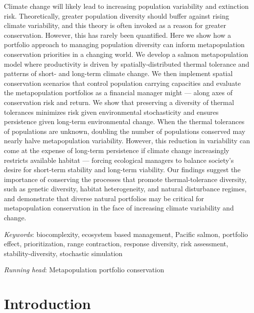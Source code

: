 \documentclass[12pt,english]{article}
\begin{document}
\begin{spacing}{1.9}
Climate change will likely lead to increasing population variability and extinction risk. Theoretically, greater population diversity should buffer against rising climate variability, and this theory is often invoked as a reason for greater conservation. However, this has rarely been quantified. Here we show how a portfolio approach to managing population diversity can inform metapopulation conservation priorities in a changing world. We develop a salmon metapopulation model where productivity is driven by spatially-distributed thermal tolerance and patterns of short- and long-term climate change. We then implement spatial conservation scenarios that control population carrying capacities and evaluate the metapopulation portfolios as a financial manager might --- along axes of conservation risk and return. We show that preserving a diversity of thermal tolerances minimizes risk given environmental stochasticity and ensures persistence given long-term environmental change. When the thermal tolerances of populations are unknown, doubling the number of populations conserved may nearly halve metapopulation variability. However, this reduction in variability can come at the expense of long-term persistence if climate change increasingly restricts available habitat --- forcing ecological managers to balance society's desire for short-term stability and long-term viability. Our findings suggest the importance of conserving the processes that promote thermal-tolerance diversity, such as genetic diversity, habitat heterogeneity, and natural disturbance regimes, and demonstrate that diverse natural portfolios may be critical for metapopulation conservation in the face of increasing climate variability and change.

\noindent
\textit{Keywords}: biocomplexity, ecosystem based management, Pacific salmon, portfolio effect, prioritization, range contraction, response diversity, risk assessment, stability-diversity, stochastic simulation

\noindent
\textit{Running head}: Metapopulation portfolio conservation

\section{Introduction}\label{introduction}


\end{spacing}
\end{document}
